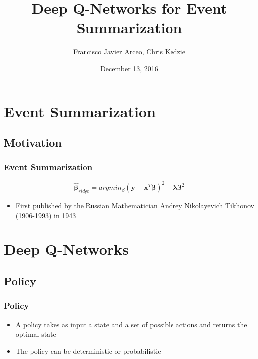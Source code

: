 \documentclass[]{beamer}
\begin{document}
\title{Deep Q-Networks for Event Summarization}  
\author{Francisco Javier Arceo, Chris Kedzie}
\date{December 13, 2016}


\begin{frame}
\titlepage
\end{frame}

\begin{frame}
	\tableofcontents
\end{frame}


\section{Event Summarization}
	\subsection{Motivation}
\begin{frame}
	\frametitle{Event Summarization} 
	\begin{equation}
		\boldsymbol{\hat{\beta}}_{ridge} = argmin_{\beta} (\boldsymbol{y - x}^{T} \boldsymbol{\beta})^2 + \boldsymbol{\lambda \beta}^2
	\end{equation}

	\begin{itemize}
		\item<1-> First published by the Russian Mathematician Andrey Nikolayevich Tikhonov (1906-1993) in 1943 %
	\end{itemize}

\end{frame}

\section{Deep Q-Networks}
	\subsection{Policy}

	\begin{frame}
			\frametitle{Policy}
			\begin{itemize}
				\item<1-> A policy takes as input a state and a set of possible actions and returns the optimal state
				\item<1-> The policy can be deterministic or probabilistic
			\end{itemize}
	\end{frame}
\end{document}
